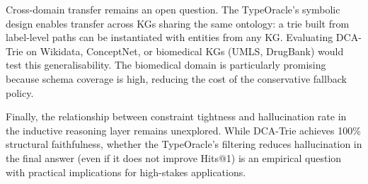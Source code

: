 Cross-domain transfer remains an open question. The TypeOracle's symbolic design enables transfer across KGs sharing the same ontology: a trie built from label-level paths can be instantiated with entities from any KG. Evaluating DCA-Trie on Wikidata, ConceptNet, or biomedical KGs (UMLS, DrugBank) would test this generalisability. The biomedical domain is particularly promising because schema coverage is high, reducing the cost of the conservative fallback policy.

Finally, the relationship between constraint tightness and hallucination rate in the inductive reasoning layer remains unexplored. While DCA-Trie achieves 100\% structural faithfulness, whether the TypeOracle's filtering reduces hallucination in the final answer (even if it does not improve Hits@1) is an empirical question with practical implications for high-stakes applications.
